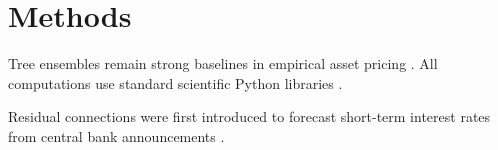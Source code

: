 \section{Methods}

Tree ensembles \citep{breiman2001random} remain strong baselines in empirical
asset pricing \citep[see][]{gu2020empirical}. All computations use standard
scientific Python libraries \citep{harris2020numpy, pedregosa2011scikit}.

Residual connections were first introduced to forecast short-term interest
rates from central bank announcements \citep{he2016resnet}.
